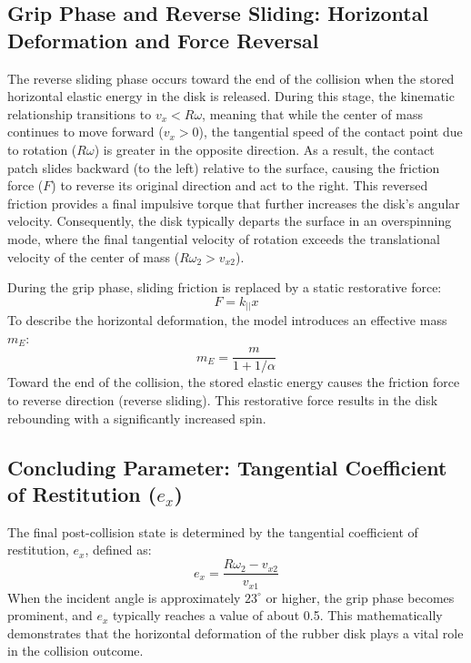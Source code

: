 \documentclass[11pt,letterpaper]{article}
\begin{document}
\subsection{Grip Phase and Reverse Sliding: Horizontal Deformation and Force Reversal}
The reverse sliding phase occurs toward the end of the collision when the stored horizontal elastic energy in the disk is released. During this stage, the kinematic relationship transitions to $v_x < R\omega$, meaning that while the center of mass continues to move forward ($v_x > 0$), the tangential speed of the contact point due to rotation ($R\omega$) is greater in the opposite direction. As a result, the contact patch slides backward (to the left) relative to the surface, causing the friction force ($F$) to reverse its original direction and act to the right. This reversed friction provides a final impulsive torque that further increases the disk's angular velocity. Consequently, the disk typically departs the surface in an overspinning mode, where the final tangential velocity of rotation exceeds the translational velocity of the center of mass ($R\omega_2 > v_{x2}$).

During the grip phase, sliding friction is replaced by a static restorative force:
\begin{equation}
F = k_{||} x
\end{equation}
To describe the horizontal deformation, the model introduces an effective mass $m_E$:
\begin{equation}
m_E = \frac{m}{1 + 1/\alpha}
\end{equation}
\noindent Toward the end of the collision, the stored elastic energy causes the friction force to reverse direction (reverse sliding). This restorative force results in the disk rebounding with a significantly increased spin.

\subsection{Concluding Parameter: Tangential Coefficient of Restitution ($e_x$)}
The final post-collision state is determined by the tangential coefficient of restitution, $e_x$, defined as:
\begin{equation}
e_x = \frac{R\omega_2 - v_{x2}}{v_{x1}}
\end{equation}
When the incident angle is approximately $23^\circ$ or higher, the grip phase becomes prominent, and $e_x$ typically reaches a value of about 0.5. This mathematically demonstrates that the horizontal deformation of the rubber disk plays a vital role in the collision outcome.
\end{document}
